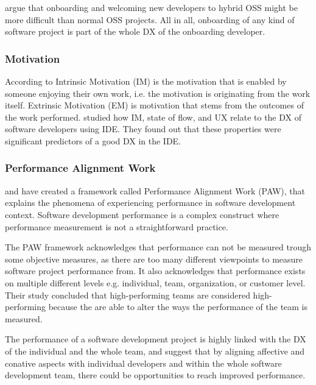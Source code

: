 \documentclass[english, 12pt, a4paper, sci, utf8, a-1b, online]{aaltothesis}
\begin{document}
\textcite{entering-an-ecosystem} argue that onboarding and welcoming new developers to hybrid OSS might be more difficult than normal OSS projects. All in all, onboarding of any kind of software project is part of the whole DX of the onboarding developer.

\subsubsection{Motivation}

According to \textcite{flow-intrinsic-dx} Intrinsic Motivation (IM) is the motivation that is enabled by someone enjoying their own work, i.e. the motivation is originating from the work itself. Extrinsic Motivation (EM) is motivation that stems from the outcomes of the work performed. \textcite{flow-intrinsic-dx} studied how IM, state of flow, and UX relate to the DX of software developers using IDE. They found out that these properties were significant predictors of a good DX in the IDE.

\subsubsection{Performance Alignment Work}

\textcite{how-developers-experience-team-performance} and \textcite{paw} have created a framework called Performance Alignment Work (PAW), that explains the phenomena of experiencing performance in software development context. Software development performance is a complex construct where performance measurement is not a straightforward practice.

The PAW framework acknowledges that performance can not be measured trough some objective measures, as there are too many different viewpoints to measure software project performance from. It also acknowledges that performance exists on multiple different levels e.g. individual, team, organization, or customer level. Their study concluded that high-performing teams are considered high-performing because the are able to alter the ways the performance of the team is measured.

The performance of a software development project is highly linked with the DX of the individual and the whole team, and \textcite{how-developers-experience-team-performance} suggest that by aligning affective and conative aspects with individual developers and within the whole software development team, there could be opportunities to reach improved performance.
\end{document}

